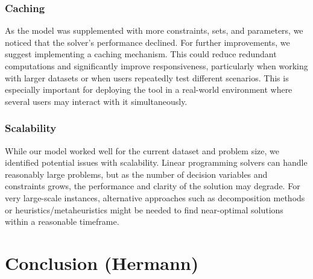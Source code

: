\documentclass{article}
\begin{document}
\subsubsection{Caching}
As the model was supplemented with more constraints, sets, and parameters, we noticed that the solver's performance 
declined. For further improvements, we suggest implementing a caching mechanism. This could reduce redundant computations 
and significantly improve responsiveness, particularly when working with larger datasets or when users repeatedly 
test different scenarios. This is especially important for deploying the tool in a real-world environment where several 
users may interact with it simultaneously.

\subsubsection{Scalability}
While our model worked well for the current dataset and problem size, we identified potential issues with scalability. 
Linear programming solvers can handle reasonably large problems, but as the number of decision variables and constraints 
grows, the performance and clarity of the solution may degrade. For very large-scale instances, alternative approaches 
such as decomposition methods or heuristics/metaheuristics might be needed to find near-optimal solutions within a 
reasonable timeframe.

\newpage

\section{Conclusion (Hermann)}
\end{document}

